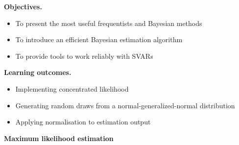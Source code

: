 \documentclass[notes,blackandwhite,mathsans,usenames,dvipsnames]{beamer}
\begin{document}
{
\begin{frame}

\bigskip\textbf{\color{mcxs1}Objectives.}
\begin{itemize}[label=$\blacktriangleright$]
\item {\color{mcxs1}To present the most useful frequentists and Bayesian methods}
\item {\color{mcxs1}To introduce an efficient Bayesian estimation algorithm}
\item {\color{mcxs1}To provide tools to work reliably with SVARs }
\end{itemize}

\bigskip\textbf{\color{mcxs4}Learning outcomes.}
\begin{itemize}[label=$\blacktriangleright$]
\item {\color{mcxs4}Implementing concentrated likelihood }
\item {\color{mcxs4}Generating random draws from a normal-generalized-normal distribution}
\item {\color{mcxs4}Applying normalisation to estimation output}
\end{itemize}

\end{frame}
}















{
\begin{frame}

\begin{adjustwidth}{-0.5cm}{0cm}
\vspace{8.3cm}\Large
\textbf{{\color{mcxs1}Maximum likelihood} {\color{mcxs4}estimation}}
\end{adjustwidth}

\end{frame}
}
\end{document}

